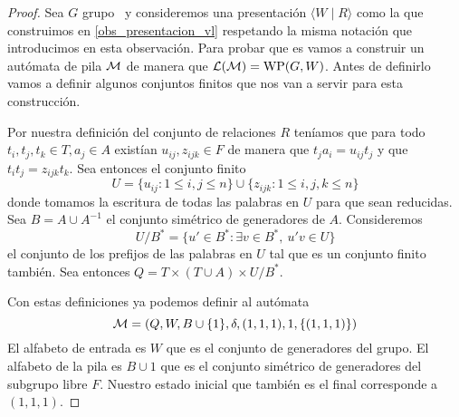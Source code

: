 \documentclass[tesis.tex]{subfiles}
\begin{document}
\begin{proof}
	Sea $G$ grupo \vl  \ y consideremos una presentación $\langle W  \mid  R \rangle$ como la que construimos en \ref{obs_presentacion_vl} respetando la misma notación que introducimos en esta observación.
	Para probar que es \ic vamos a construir un autómata de pila $\cal M$ de manera que  $ {\cal L(M)}= \text{WP}(G,W)$.
	Antes de definirlo vamos a definir algunos conjuntos finitos que nos van a servir para esta construcción.
	
	Por nuestra definición del conjunto de relaciones $R$ teníamos que para todo $t_{i}, t_{j}, t_{k} \in T, a_{j} \in A$ existían $u_{ij}, z_{ijk} \in F$ de manera que 
	$t_j a_i = u_{ij} t_j $ y que $ t_it_j = z_{ijk}t_k $. 
	Sea entonces el conjunto finito 
	\[
		U =  \{u_{ij} : 1 \le i,j \le n\}  \cup  \{z_{ijk} : 1 \le i,j,k \le n\} 
	\]
	donde tomamos la escritura de todas las palabras en $U$ para que sean reducidas.
	Sea $B = A \cup A^{-1}$ el conjunto simétrico de generadores de $A$.
	Consideremos 
	\[
		U/B^* = \{ u' \in B^* : \exists v \in B^*, \  u'v \in U  \}
	\]
	el conjunto de los prefijos de las palabras en $U$  tal que es un conjunto finito también.
	Sea entonces $Q = T \times (T \cup A) \times U/B^* $.
	
	Con estas definiciones ya podemos definir al autómata
	\[
	{\cal M }= (Q, W , B \cup \{ 1 \}, \delta, (1,1,1), 1 ,\{(1,1,1)\})
	\]
	El alfabeto de entrada es $W$ que es el conjunto de generadores del grupo.
	El alfabeto de la pila es $B \cup 1$ que es el conjunto simétrico de generadores del subgrupo libre $F$.
	Nuestro estado inicial que también es el final corresponde a $(1,1,1)$.
	

\end{proof}
\end{document}
